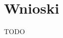 \documentclass[a4paper,11pt,twoside]{mwrep}  %
\begin{document}
\endgroup


\begingroup
\let\clearpage\relax
\chapter{Wnioski}

TODO\\

\endgroup



%
\end{document}
